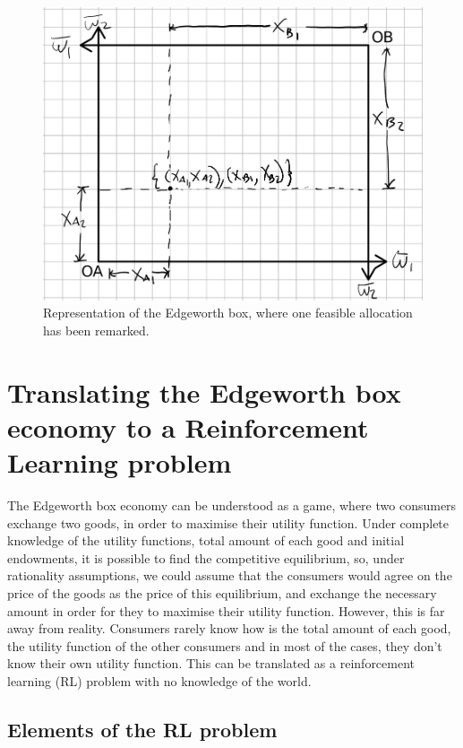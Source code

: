 \documentclass{article}
\begin{document}
\begin{figure}
    \centering
    \includegraphics[scale=0.25]{box1.png}
    \caption{Representation of the Edgeworth box, where one feasible allocation has been remarked.}
    \label{box1}
\end{figure}


\section{Translating the Edgeworth box economy to a Reinforcement Learning problem}

The Edgeworth box economy can be understood as a game, where two consumers exchange two goods, in order to maximise their utility function. Under complete knowledge of the utility functions, total amount of each good and initial endowments, it is possible to find the competitive equilibrium, so, under rationality assumptions, we could assume that the consumers would agree on the price of the goods as the price of this equilibrium, and exchange the necessary amount in order for they to maximise their utility function. However, this is far away from reality. Consumers rarely know how is the total amount of each good, the utility function of the other consumers and in most of the cases, they don't know their own utility function. This can be translated as a reinforcement learning (RL) problem with no knowledge of the world. 
\subsection*{Elements of the RL problem}
\end{document}
